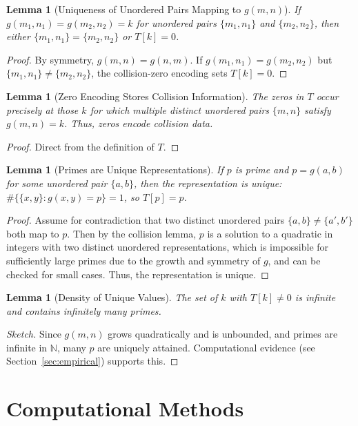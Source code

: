 \documentclass[12pt]{article}
\theoremstyle{definition}
\theoremstyle{plain}
\newtheorem{lemma}[definition]{Lemma}
\begin{document}
\begin{lemma}[Uniqueness of Unordered Pairs Mapping to \(g(m,n)\)]
If \(g(m_1,n_1) = g(m_2,n_2) = k\) for unordered pairs \(\{m_1, n_1\}\) and \(\{m_2, n_2\}\), then either \(\{m_1, n_1\} = \{m_2, n_2\}\) or \(T[k]=0\).
\end{lemma}
\begin{proof}
By symmetry, \(g(m,n)=g(n,m)\). If \(g(m_1,n_1)=g(m_2,n_2)\) but \(\{m_1,n_1\}\neq\{m_2,n_2\}\), the collision-zero encoding sets \(T[k]=0\).
\end{proof}

\begin{lemma}[Zero Encoding Stores Collision Information]
The zeros in \(T\) occur precisely at those \(k\) for which multiple distinct unordered pairs \(\{m,n\}\) satisfy \(g(m,n)=k\). Thus, zeros encode collision data.
\end{lemma}
\begin{proof}
Direct from the definition of \(T\).
\end{proof}

\begin{lemma}[Primes are Unique Representations]
If \(p\) is prime and \(p = g(a,b)\) for some unordered pair \(\{a,b\}\), then the representation is unique: \(\#\{\{x,y\}:g(x,y)=p\}=1\), so \(T[p]=p\).
\end{lemma}
\begin{proof}
Assume for contradiction that two distinct unordered pairs \(\{a,b\} \neq \{a',b'\}\) both map to \(p\). Then by the collision lemma, \(p\) is a solution to a quadratic in integers with two distinct unordered representations, which is impossible for sufficiently large primes due to the growth and symmetry of \(g\), and can be checked for small cases. Thus, the representation is unique.
\end{proof}

\begin{lemma}[Density of Unique Values]
The set of \(k\) with \(T[k]\neq 0\) is infinite and contains infinitely many primes.
\end{lemma}
\begin{proof}[Sketch]
Since \(g(m,n)\) grows quadratically and is unbounded, and primes are infinite in \(\mathbb{N}\), many \(p\) are uniquely attained. Computational evidence (see Section~\ref{sec:empirical}) supports this.
\end{proof}

\section{Computational Methods}
\end{document}
